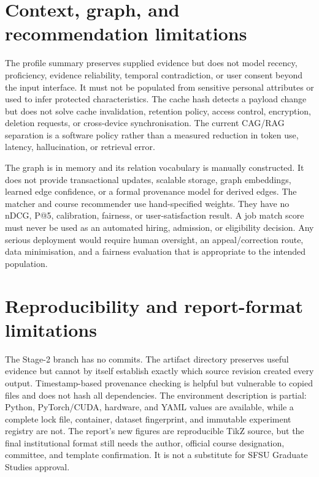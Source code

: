 \section{Context, graph, and recommendation limitations}

The profile summary preserves supplied evidence but does not model recency, proficiency, evidence reliability, temporal contradiction, or user consent beyond the input interface. It must not be populated from sensitive personal attributes or used to infer protected characteristics. The cache hash detects a payload change but does not solve cache invalidation, retention policy, access control, encryption, deletion requests, or cross-device synchronisation. The current CAG/RAG separation is a software policy rather than a measured reduction in token use, latency, hallucination, or retrieval error.

The graph is in memory and its relation vocabulary is manually constructed. It does not provide transactional updates, scalable storage, graph embeddings, learned edge confidence, or a formal provenance model for derived edges. The matcher and course recommender use hand-specified weights. They have no nDCG, P@5, calibration, fairness, or user-satisfaction result. A job match score must never be used as an automated hiring, admission, or eligibility decision. Any serious deployment would require human oversight, an appeal/correction route, data minimisation, and a fairness evaluation that is appropriate to the intended population.

\section{Reproducibility and report-format limitations}

The Stage-2 branch has no commits. The artifact directory preserves useful evidence but cannot by itself establish exactly which source revision created every output. Timestamp-based provenance checking is helpful but vulnerable to copied files and does not hash all dependencies. The environment description is partial: Python, PyTorch/CUDA, hardware, and YAML values are available, while a complete lock file, container, dataset fingerprint, and immutable experiment registry are not. The report's new figures are reproducible TikZ source, but the final institutional format still needs the author, official course designation, committee, and template confirmation. It is not a substitute for SFSU Graduate Studies approval.

